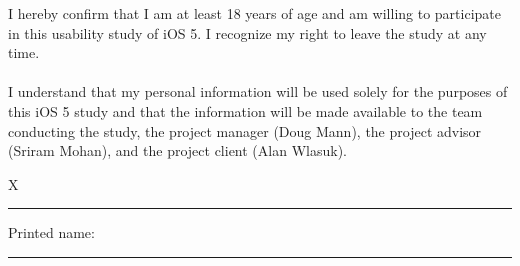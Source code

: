 \documentclass{article}
\begin{document}
\rhead{}

I hereby confirm that I am at least 18 years of age and am willing to participate in this usability study of iOS 5.  I recognize my right to leave the study at any time.
\\\\
\indent I understand that my personal information will be used solely for the purposes of this iOS 5 study and that the information will be made available to the team conducting the study, the project manager (Doug Mann), the project advisor (Sriram Mohan), and the project client (Alan Wlasuk).

\vspace{2cm}
{\large X} \rule{4in}{1pt}

\vspace{1cm}
\large Printed name: \rule{4in}{1pt}
\end{document}
